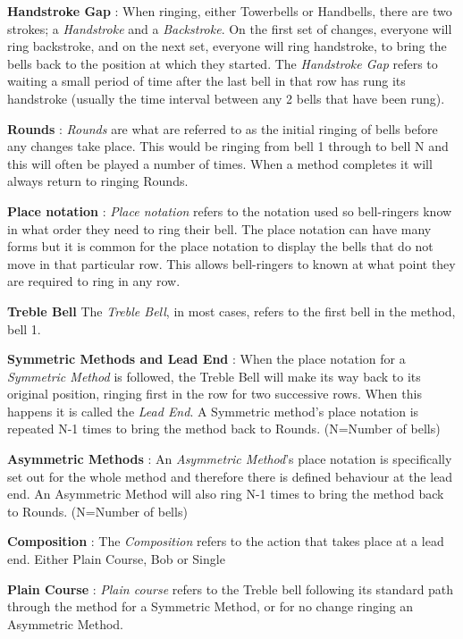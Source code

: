 \documentclass{l4proj}
\begin{document}
\textbf{Handstroke Gap} : When ringing, either Towerbells or Handbells, there are two strokes; a \textit{Handstroke} and a \textit{Backstroke}.  On the first set of changes, everyone will ring backstroke, and on the next set, everyone will ring handstroke, to bring the bells back to the position at which they started. The \textit{Handstroke Gap} refers to waiting a small period of time after the last bell in that row has rung its handstroke (usually the time interval between any 2 bells that have been rung).

\textbf{Rounds} : \textit{Rounds} are what are referred to as the initial ringing of bells before any changes take place. This would be ringing from bell 1 through to bell N and this will often be played a number of times.  When a method completes it will always return to ringing Rounds.

\textbf{Place notation} : \textit{Place notation} refers to the notation used so bell-ringers know in what order they need to ring their bell.  The place notation can have many forms but it is common for the place notation to display the bells that do not move in that particular row. This allows bell-ringers to known at what point they are required to ring in any row.  

\textbf{Treble Bell} The \textit{Treble Bell}, in most cases, refers to the first bell in the method, bell 1.

\textbf{Symmetric Methods and Lead End} : When the place notation for a \textit{Symmetric Method }is followed, the Treble Bell will make its way back to its original position, ringing first in the row for two successive rows.  When this happens it is called the \textit{Lead End}. A Symmetric method's place notation is repeated N-1 times to bring the method back to Rounds. (N=Number of bells)

\textbf{Asymmetric Methods} : An \textit{Asymmetric Method}'s place notation is specifically set out for the whole method and therefore there is defined behaviour at the lead end. An Asymmetric Method will also ring N-1 times to bring the method back to Rounds. (N=Number of bells)

\textbf{Composition} : The \textit{Composition} refers to the action that takes place at a lead end. Either Plain Course, Bob or Single

\textbf{Plain Course } : \textit{Plain course} refers to the Treble bell following its standard path through the method for a Symmetric Method, or for no change ringing an Asymmetric Method.
\end{document}
